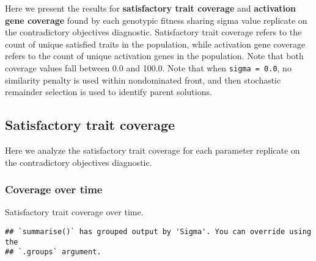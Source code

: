 \documentclass[]{book}
\newenvironment{Shaded}{\begin{snugshade}}{\end{snugshade}}
\newcommand{\DataTypeTok}[1]{\textcolor[rgb]{0.13,0.29,0.53}{#1}}
\newcommand{\KeywordTok}[1]{\textcolor[rgb]{0.13,0.29,0.53}{\textbf{#1}}}
\newcommand{\NormalTok}[1]{#1}
\newcommand{\OperatorTok}[1]{\textcolor[rgb]{0.81,0.36,0.00}{\textbf{#1}}}
\newcommand{\StringTok}[1]{\textcolor[rgb]{0.31,0.60,0.02}{#1}}
\begin{document}
Here we present the results for \textbf{satisfactory trait coverage} and \textbf{activation gene coverage} found by each genotypic fitness sharing sigma value replicate on the contradictory objectives diagnostic.
Satisfactory trait coverage refers to the count of unique satisfied traits in the population, while activation gene coverage refers to the count of unique activation genes in the population.
Note that both coverage values fall between 0.0 and 100.0.
Note that when \texttt{sigma\ =\ 0.0}, no similarity penalty is used within nondominated front, and then stochastic remainder selection is used to identify parent solutions.

\hypertarget{satisfactory-trait-coverage-4}{%
\subsection{Satisfactory trait coverage}\label{satisfactory-trait-coverage-4}}

Here we analyze the satisfactory trait coverage for each parameter replicate on the contradictory objectives diagnostic.

\hypertarget{coverage-over-time-14}{%
\subsubsection{Coverage over time}\label{coverage-over-time-14}}

Satisfactory trait coverage over time.

\begin{Shaded}
\end{Shaded}

\begin{verbatim}
## `summarise()` has grouped output by 'Sigma'. You can override using the
## `.groups` argument.
\end{verbatim}
\end{document}
